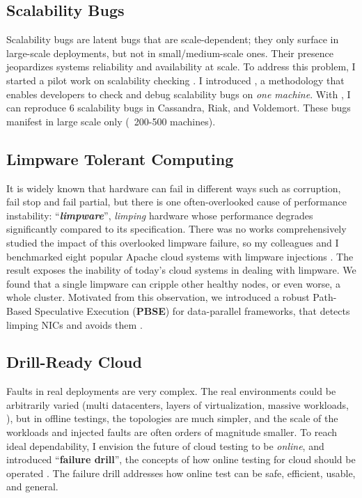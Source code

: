 \documentclass[11pt]{article}
\begin{document}
\subsection{Scalability Bugs}

Scalability bugs are latent bugs that are scale-dependent; they only surface in
large-scale deployments, but not in small/medium-scale ones. Their presence
jeopardizes systems reliability and availability at scale. 
%
To address this problem, I started a pilot work on scalability checking
\cite{Gunawi+17-ScaleCheck-Insub}. I introduced \sck, a methodology that enables
developers to check and debug scalability bugs on \textit{one machine}. With
\sck, I can reproduce 6 scalability bugs in Cassandra, Riak, and Voldemort.
These bugs manifest in large scale only (\eg\ 200-500 machines). 

\subsection{Limpware Tolerant Computing}

It is widely known that hardware can fail in different ways such as corruption,
fail stop and fail partial, but there is one often-overlooked cause of
performance instability: ``\textbf{\textit{limpware}}'', \textit{limping}
hardware whose performance degrades significantly compared to its specification.
There was no works comprehensively studied the impact of this overlooked
limpware failure, so my colleagues and I benchmarked eight popular Apache cloud
systems with limpware injections \cite{Do+13-Limplock}. The result exposes the
inability of today's cloud systems in dealing with limpware. We found that a
single limpware can cripple other healthy nodes, or even worse, a whole cluster.
Motivated from this observation, we introduced a robust Path-Based Speculative
Execution (\textbf{PBSE}) for data-parallel frameworks, that detects limping
NICs and avoids them \cite{Suminto+17-PBSE-InSub}.

\subsection{Drill-Ready Cloud} 

Faults in real deployments are very complex. The real environments could be
arbitrarily varied (multi datacenters, layers of virtualization, massive
workloads, \etc), but in offline testings, the topologies are much simpler, and
the scale of the workloads and injected faults are often orders of magnitude
smaller. To reach ideal dependability, I envision the future of cloud testing to
be \textit{online}, and introduced ``\textbf{failure drill}'', the concepts of
how online testing for cloud should be operated
\cite{Leesatapornwongsa+14-Drill-fixed}.  The failure drill addresses how online
test can be safe, efficient, usable, and general.
\end{document}
